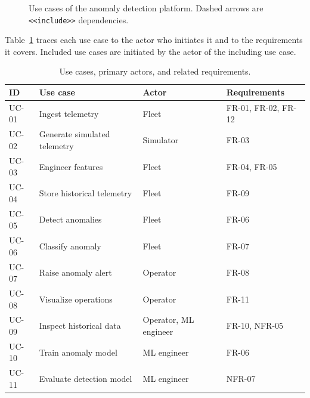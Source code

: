 \begin{figure}[htbp]
{%
  }
  \caption{Use cases of the anomaly detection platform. Dashed arrows are \texttt{<<include>>} dependencies.}
  \label{fig:use-cases}
\end{figure}

Table~\ref{tab:use-case-trace} traces each use case to the actor who initiates it and to the requirements it covers. Included use cases are initiated by the actor of the including use case.

\begin{table}[htbp]
  \centering
  \footnotesize
  \caption{Use cases, primary actors, and related requirements.}
  \label{tab:use-case-trace}
  \begin{tabularx}{\linewidth}{@{}l X l l@{}}
    \toprule
    \textbf{ID} & \textbf{Use case} & \textbf{Actor} & \textbf{Requirements} \\
    \midrule
    UC-01 & Ingest telemetry & Fleet & FR-01, FR-02, FR-12 \\
    UC-02 & Generate simulated telemetry & Simulator & FR-03 \\
    UC-03 & Engineer features & Fleet & FR-04, FR-05 \\
    UC-04 & Store historical telemetry & Fleet & FR-09 \\
    UC-05 & Detect anomalies & Fleet & FR-06 \\
    UC-06 & Classify anomaly & Fleet & FR-07 \\
    UC-07 & Raise anomaly alert & Operator & FR-08 \\
    UC-08 & Visualize operations & Operator & FR-11 \\
    UC-09 & Inspect historical data & Operator, ML engineer & FR-10, NFR-05 \\
    UC-10 & Train anomaly model & ML engineer & FR-06 \\
    UC-11 & Evaluate detection model & ML engineer & NFR-07 \\
    \bottomrule
  \end{tabularx}
\end{table}

